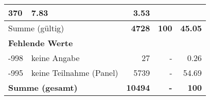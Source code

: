 \begin{longtable}{lXrrr}
       \num{370} &
       \num[round-mode=places,round-precision=2]{7,83} &
         \num[round-mode=places,round-precision=2]{3,53} \\
     \midrule
     \multicolumn{2}{l}{Summe (gültig)} &
       \textbf{\num{4728}} &
     \textbf{100} &
       \textbf{\num[round-mode=places,round-precision=2]{45,05}} \\
     \multicolumn{5}{l}{\textbf{Fehlende Werte}}\\
       -998 &
       keine Angabe &
         \num{27} &
        - &
         \num[round-mode=places,round-precision=2]{0,26} \\
       -995 &
       keine Teilnahme (Panel) &
         \num{5739} &
        - &
         \num[round-mode=places,round-precision=2]{54,69} \\
     \midrule
     \multicolumn{2}{l}{\textbf{Summe (gesamt)}} &
          \textbf{\num{10494}} &
        \textbf{-} &
        \textbf{100} \\
     \bottomrule
     \end{longtable}
     
